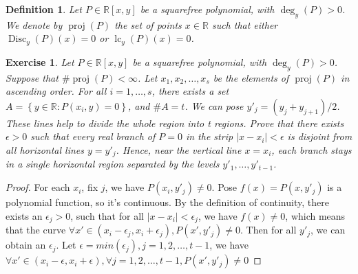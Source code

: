 \documentclass{article}
\newtheorem{definition}{Definition}
\newtheorem{exercise}{Exercise}
\begin{document}
\begin{definition}
    Let $P\in\mathbb{R}[x,y]$ be a squarefree polynomial, with $\deg_{y}(P) > 0$. We denote by $\operatorname{proj}(P)$ the set of points $x\in\mathbb{R}$ such that either $\operatorname{Disc}_{y}(P)(x)=0$ or $\operatorname{lc}_{y}(P)(x)=0$.
\end{definition}

\begin{exercise}
    Let $P \in \mathbb{R}[x,y]$ be a squarefree polynomial, with $\deg_{y}(P) > 0$. Suppose that $\#\operatorname{proj}(P)<\infty$. Let $x_{1},x_{2},\dots,x_{s}$ be the elements of $\operatorname{proj}(P)$ in ascending order. For all $i = 1, \dots, s$,
    there exists a set \(A = \left\{y \in \mathbb{R}: P(x_{i},y) = 0\right\}\), and \(\#A = t\). We can pose \(y'_{j} = (y_{j} +y_{j+1})/2\). These lines help to divide the whole region into t regions. Prove that there exists \(\epsilon>0\) such that every real branch of \(P=0\) in the strip \(|x-x_i|<\epsilon\) is disjoint from all horizontal lines \(y=y'_j\). Hence, near the vertical line \(x=x_i\), each branch stays in a single horizontal region separated by the levels \(y'_1,\dots,y'_{t-1}\).
\end{exercise}

\begin{proof}
    For each \(x_{i}\), fix \(j\), we have \(P(x_{i}, y'_{j}) \neq 0\). Pose \(f(x) = P(x, y'_{j})\) is a polynomial function, so it's continuous. By the definition of continuity, there exists an \(\epsilon_{j} > 0\), such that for all \(|x-x_{i}| < \epsilon_{j}\), we have \(f(x) \neq 0\), which means that the curve \(\forall x' \in (x_{i}-\epsilon_{j}, x_{i}+\epsilon_{j}), P(x', y'_{j}) \neq 0\). Then for all \(y'_{j}\), we can obtain an \(\epsilon_{j}\). Let \(\epsilon = min(\epsilon_{j}), j = 1,2,\dots, t-1\), we have \(\forall x' \in (x_{i}-\epsilon, x_{i}+\epsilon), \forall j = 1,2,\dots, t-1, P(x', y'_{j}) \neq 0\)
\end{proof}
\end{document}
